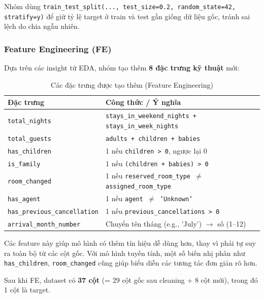 \documentclass[12pt, a4paper]{article}
\begin{document}
Nhóm dùng \texttt{train\_test\_split(..., test\_size=0.2, random\_state=42, stratify=y)} để giữ tỷ lệ target ở train và test gần giống dữ liệu gốc, tránh sai lệch do chia ngẫu nhiên.

\subsubsection{Feature Engineering (FE)}

Dựa trên các insight từ EDA, nhóm tạo thêm \textbf{8 đặc trưng kỹ thuật} mới:

\begin{table}[h!]
\centering
\caption{Các đặc trưng được tạo thêm (Feature Engineering)}
\renewcommand{\arraystretch}{1.3}
\begin{tabular}{|l|p{9cm}|}
\hline
\textbf{Đặc trưng} & \textbf{Công thức / Ý nghĩa} \\ \hline
\texttt{total\_nights}              & \texttt{stays\_in\_weekend\_nights + stays\_in\_week\_nights} \\ \hline
\texttt{total\_guests}              & \texttt{adults + children + babies} \\ \hline
\texttt{has\_children}              & 1 nếu \texttt{children > 0}, ngược lại 0 \\ \hline
\texttt{is\_family}                 & 1 nếu \texttt{(children + babies) > 0} \\ \hline
\texttt{room\_changed}              & 1 nếu \texttt{reserved\_room\_type $\neq$ assigned\_room\_type} \\ \hline
\texttt{has\_agent}                 & 1 nếu \texttt{agent $\neq$ 'Unknown'} \\ \hline
\texttt{has\_previous\_cancellation}& 1 nếu \texttt{previous\_cancellations > 0} \\ \hline
\texttt{arrival\_month\_number}     & Chuyển tên tháng (e.g., 'July') $\to$ số (1--12) \\ \hline
\end{tabular}
\end{table}

Các feature này giúp mô hình có thêm tín hiệu dễ dùng hơn, thay vì phải tự suy ra toàn bộ từ các cột gốc. Với mô hình tuyến tính, một số biến nhị phân như \texttt{has\_children}, \texttt{room\_changed} cũng giúp biểu diễn các tương tác đơn giản rõ hơn.

Sau khi FE, dataset có \textbf{37 cột} (= 29 cột gốc sau cleaning + 8 cột mới), trong đó 1 cột là target.

\newpage
\end{document}
